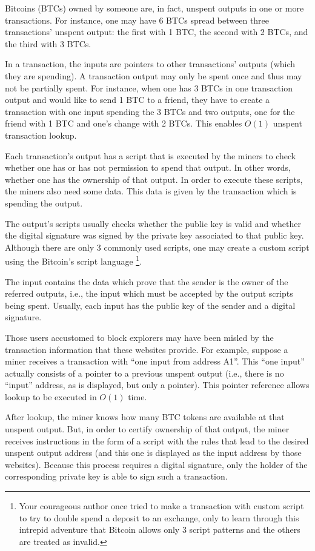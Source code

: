 Bitcoins (BTCs) owned by someone are, in fact, unspent outputs in one or more transactions. For instance, one may have 6 BTCs spread between three transactions' unspent output: the first with 1 BTC, the second with 2 BTCs, and the third with 3 BTCs.

In a transaction, the inputs are pointers to other transactions' outputs (which they are spending). A transaction output may only be spent once and thus may not be partially spent. For instance, when one has 3 BTCs in one transaction output and would like to send 1 BTC to a friend, they have to create a transaction with one input spending the 3 BTCs and two outputs, one for the friend with 1 BTC and one's change with 2 BTCs. This enables $O(1)$ unspent transaction lookup.

Each transaction's output has a script that is executed by the miners to check whether one has or has not permission to spend that output. In other words, whether one has the ownership of that output. In order to execute these scripts, the miners also need some data. This data is given by the transaction which is spending the output.

The output's scripts usually checks whether the public key is valid and whether the digital signature was signed by the private key associated to that public key. Although there are only 3 commonly used scripts, one may create a custom script using the Bitcoin's script language \footnote{Your courageous author once tried to make a transaction with custom script to try to double spend a deposit to an exchange, only to learn through this intrepid adventure that Bitcoin allows only 3 script patterns and the others are treated as invalid.}.

The input contains the data which prove that the sender is the owner of the referred outputs, i.e., the input which must be accepted by the output scripts being spent. Usually, each input has the public key of the sender and a digital signature.

Those users accustomed to block explorers may have been misled by the transaction information that these websites provide.  For example, suppose a miner receives a transaction with ``one input from address A1''.  This ``one input'' actually consists of a pointer to a previous unspent output (i.e., there is no ``input'' address, as is displayed, but only a pointer). This pointer reference allows lookup to be executed in $O(1)$ time. 

After lookup, the miner knows how many BTC tokens are available at that unspent output.  But, in order to certify ownership of that output, the miner receives instructions in the form of a script with the rules that lead to the desired unspent output address (and this one is displayed as the input address by those websites). Because this process requires a digital signature, only the holder of the corresponding private key is able to sign such a transaction.

